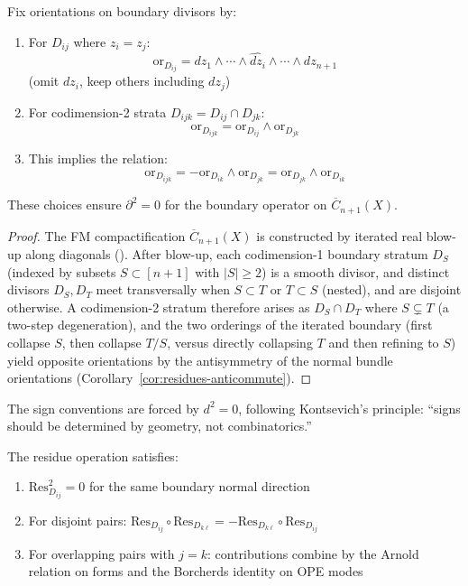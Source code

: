  \begin{lemma}\label{lem:orientation}
 Fix orientations on boundary divisors by:
 \begin{enumerate}
 \item For $D_{ij}$ where $z_i = z_j$:
 \[\text{or}_{D_{ij}} = dz_1 \wedge \cdots \wedge \widehat{dz_i} \wedge \cdots \wedge dz_{n+1}\]
 (omit $dz_i$, keep others including $dz_j$)

 \item For codimension-2 strata $D_{ijk} = D_{ij} \cap D_{jk}$:
 \[\text{or}_{D_{ijk}} = \text{or}_{D_{ij}} \wedge \text{or}_{D_{jk}}\]

 \item This implies the relation:
 \[\text{or}_{D_{ijk}} = -\text{or}_{D_{ik}} \wedge \text{or}_{D_{jk}} = \text{or}_{D_{jk}} \wedge \text{or}_{D_{ik}}\]
 \end{enumerate}

 These choices ensure $\partial^2 = 0$ for the boundary operator on $\overline{C}_{n+1}(X)$.
 \end{lemma}

 \begin{proof}
 The FM compactification $\overline{C}_{n+1}(X)$ is constructed by iterated real blow-up along diagonals (\cite[\S2]{FM94}). After blow-up, each codimension-1 boundary stratum $D_S$ (indexed by subsets $S \subset [n+1]$ with $|S| \geq 2$) is a smooth divisor, and distinct divisors $D_S, D_T$ meet transversally when $S \subset T$ or $T \subset S$ (nested), and are disjoint otherwise. A codimension-2 stratum therefore arises as $D_S \cap D_T$ where $S \subsetneq T$ (a two-step degeneration), and the two orderings of the iterated boundary (first collapse $S$, then collapse $T/S$, versus directly collapsing $T$ and then refining to $S$) yield opposite orientations by the antisymmetry of the normal bundle orientations (Corollary~\ref{cor:residues-anticommute}).
 \end{proof}

 \begin{remark}
 The sign conventions are forced by $d^2 = 0$, following Kontsevich's principle: ``signs should be determined by geometry, not combinatorics.''
 \end{remark}

 \begin{lemma}
 \label{lem:residue-properties}
 The residue operation satisfies:
 \begin{enumerate}
 \item $\text{Res}_{D_{ij}}^2 = 0$ for the same boundary normal direction
 \item For disjoint pairs: $\text{Res}_{D_{ij}} \circ \text{Res}_{D_{k\ell}} = -\text{Res}_{D_{k\ell}} \circ \text{Res}_{D_{ij}}$
 \item For overlapping pairs with $j = k$: contributions combine by the Arnold relation on forms and the Borcherds identity on OPE modes
 \end{enumerate}
 \end{lemma}

